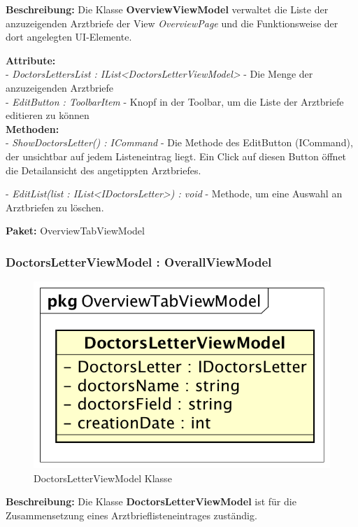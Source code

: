 \documentclass[a4paper]{scrreprt}
\begin{document}
\textbf{Beschreibung:} Die Klasse \textbf{OverviewViewModel} verwaltet die Liste der anzuzeigenden Arztbriefe der View \textit{OverviewPage} und die Funktionsweise der dort angelegten UI-Elemente.

\textbf{Attribute:}\\
- \textit{DoctorsLettersList : IList<DoctorsLetterViewModel>} - Die Menge der anzuzeigenden Arztbriefe\\
- \textit{EditButton : ToolbarItem} - Knopf in der Toolbar, um die Liste der Arztbriefe editieren zu können\\

\textbf{Methoden:}\\
- \textit{ShowDoctorsLetter() : ICommand} - Die Methode des EditButton (ICommand), der unsichtbar auf jedem Listeneintrag liegt. Ein Click auf diesen Button öffnet die Detailansicht des angetippten Arztbriefes.

- \textit{EditList(list : IList<IDoctorsLetter>) : void} - Methode, um eine Auswahl an Arztbriefen zu löschen.

\textbf{Paket:} OverviewTabViewModel

\subsubsection{DoctorsLetterViewModel : OverallViewModel}
\begin{figure}[H]
\centering
\includegraphics[width=0.45\textheight]{graphics/Klassendiagramme/ViewModel/DoctorsLetterViewModel.png}
\caption{DoctorsLetterViewModel Klasse}
\end{figure}

\textbf{Beschreibung:} Die Klasse \textbf{DoctorsLetterViewModel} ist für die Zusammensetzung eines Arztbrieflisteneintrages zuständig.
\end{document}
